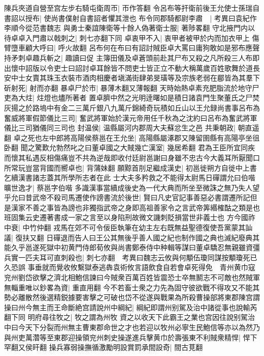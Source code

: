 陳兵夾道自營至宫左步右騎屯衛周帀|{
	帀作答翻}
令呂布等扞衛前後王允使士孫瑞自書詔以授布|{
	使尚書僕射自書詔者懼其泄也}
布令同郡騎都尉李肅　|{
	考異曰袁紀作李順今從范書魏志}
與勇士秦誼陳衛等十餘人偽著衛士服|{
	著陟畧翻}
守北掖門内以待卓卓入門肅以戟刺之|{
	刺七亦翻下同}
卓衷甲不入|{
	衷甲者被甲於内而加衣甲上}
傷臂墮車顧大呼曰|{
	呼火故翻}
呂布何在布曰有詔討賊臣卓大罵曰庸狗敢如是邪布應聲持矛刺卓趣兵斬之|{
	趣讀曰促}
主簿田儀及卓蒼頭前赴其尸布又殺之凡所殺三人布即出懷中詔版以令吏士曰詔討卓耳餘皆不問吏士皆正立不動大稱萬歲百姓歌舞於道長安中士女賣其珠玉衣裝市酒肉相慶者塡滿街肆弟旻璜等及宗族老弱在郿皆為其羣下斫射死|{
	射而亦翻}
暴卓尸於市|{
	暴薄木翻又薄報翻}
天時始熱卓素充肥脂流於地守尸吏為大炷|{
	炷燈也燼所著者}
置卓臍中然之光明逹曙如是積日諸袁門生聚董氏之尸焚灰揚之於路塢中有金二三萬斤銀八九萬斤錦綺奇玩積如丘山以王允録尚書事呂布為奮威將軍假節儀比三司|{
	奮武將軍始於漢元帝用任千秋為之沈約曰呂布為奮武將軍儀比三司猶儀同三司也}
封温侯|{
	温縣屬河内郡周大夫蘇忿生之邑}
共秉朝政|{
	朝直遥翻}
卓之死也左中郎將高陽侯蔡邕在王允坐|{
	高陽縣屬涿郡又陳留圉縣有高陽亭坐徂卧翻}
聞之驚歎允勃然叱之曰董卓國之大賊幾亡漢室|{
	幾居希翻}
君為王臣所宜同疾而懷其私遇反相傷痛豈不共為逆哉即收付廷尉邕謝曰身雖不忠古今大義耳所厭聞口所常玩豈當背國而嚮卓也|{
	背蒲妹翻}
願黥首刖足繼成漢史|{
	初邕徙朔方自徙中上書乞續漢書諸志蓋其所學所志者在此}
士大夫多矜救之不能得太尉馬日磾謂允曰伯喈曠世逸才|{
	蔡邕字伯喈}
多識漢事當續成後史為一代大典而所坐至微誅之無乃失人望乎允曰昔武帝不殺司馬遷使作謗書流於後世|{
	賢曰凡史官記事善惡必書謂遷所記但是漢家不善之事皆為謗也非獨指武帝之身即高祖善家令之言武帝筭緡榷酤之類是也班固集云史遷著書成一家之言至以身陷刑故微文譏刺貶損當世非義士也}
方今國祚中衰|{
	中竹仲翻}
戎馬在郊不可令佞臣執筆在幼主左右既無益聖德復使吾黨蒙其訕議|{
	復扶又翻}
日磾退而告人曰王公其無後乎善人國之紀也制作國之典也滅紀廢典其能久乎邕遂死獄中初黄門侍郎荀攸與尚書鄭泰侍中种輯等謀曰董卓驕忍無親雖資彊兵實一匹夫耳可直刺殺也|{
	刺七亦翻　考異曰魏志云攸與何顒伍瓊同謀按顒瓊死已久恐誤}
事垂就而覺收攸繫獄泰逃犇袁術攸言語飲食自若會卓死得免　青州黄巾寇兖州劉岱欲擊之濟北相鮑信諫曰今賊衆百萬百姓皆震恐士卒無鬭志不可敵也然賊軍無輜重唯以鈔畧為資|{
	重直用翻}
今不若畜士衆之力先為固守彼欲戰不得攻又不能其勢必離散然後選精鋭據要害擊之可破也岱不從遂與戰果為所殺曹操部將東郡陳宫謂操曰州今無主而王命斷絶宫請說州中綱紀|{
	綱紀即謂州别駕及治中諸從事也說輸芮翻下同}
明府尋往牧之|{
	牧之謂為州牧}
資之以收天下此霸王之業也宫因往說别駕治中曰今天下分裂而州無主曹東郡命世之才也若迎以牧州必寧生民鮑信等亦以為然乃與州吏萬濳等至東郡迎操領兖州刺史操遂進兵擊黄巾於壽張東不利賊衆精悍|{
	悍下罕翻又侯旰翻}
操兵寡弱操撫循激勵明設賞罰承間設奇|{
	間古莧翻}
